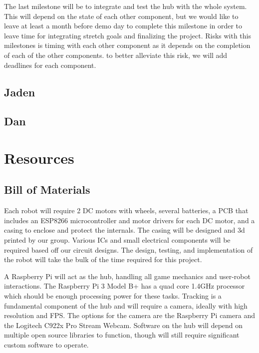 \documentclass[11pt]{ieeeconf}
\begin{document}
The last milestone will be to integrate and test the hub with the whole system. This will depend on the state of each other component, but we would like to leave at least a month before demo day to complete this milestone in order to leave time for integrating stretch goals and finalizing the project. Risks with this milestones is timing with each other component as it depends on the completion of each of the other components. to better alleviate this risk, we will add deadlines for each component.  

\subsection{Jaden}

\subsection{Dan}

\section{Resources}
\subsection{Bill of Materials}

Each robot will require 2 DC motors with wheels, several batteries, a PCB that includes an ESP8266 microcontroller and motor drivers for each DC motor, and a casing to enclose and protect the internals. The casing will be designed and 3d printed by our group. Various ICs and small electrical components will be required based off our circuit designs. The design, testing, and implementation of the robot will take the bulk of the time required for this project.

A Raspberry Pi will act as the hub, handling all game mechanics and user-robot interactions. The Raspberry Pi 3 Model B+ has a quad core 1.4GHz processor which should be enough processing power for these tasks. Tracking is a fundamental component of the hub and will require a camera, ideally with high resolution and FPS. The options for the camera are the Raspberry Pi camera and the Logitech C922x Pro Stream Webcam. Software on the hub will depend on multiple open source libraries to function, though will still require significant custom software to operate.
\end{document}

